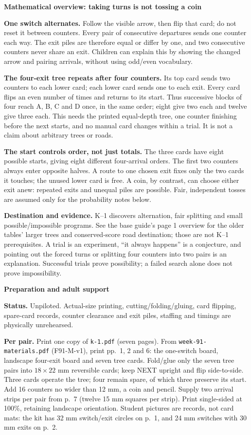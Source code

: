 \documentclass[11pt]{article}
\newcommand{\head}[1]{\par\textbf{\large #1}\par}
\newcommand{\code}[1]{\texttt{#1}}
\begin{document}
\head{Mathematical overview: taking turns is not tossing a coin}
\textbf{One switch alternates.} Follow the visible arrow, then flip that card; do not reset it between counters. Every pair of consecutive departures sends one counter each way. The exit piles are therefore equal or differ by one, and two consecutive counters never share an exit. Children can explain this by showing the changed arrow and pairing arrivals, without using odd/even vocabulary.

\textbf{The four-exit tree repeats after four counters.} Its top card sends two counters to each lower card; each lower card sends one to each exit. Every card flips an even number of times and returns to its start. Thus successive blocks of four reach A, B, C and D once, in the same order; eight give two each and twelve give three each. This needs the printed equal-depth tree, one counter finishing before the next starts, and no manual card changes within a trial. It is not a claim about arbitrary trees or roads.

\textbf{The start controls order, not just totals.} The three cards have eight possible starts, giving eight different four-arrival orders. The first two counters always enter opposite halves. A route to one chosen exit fixes only the two cards it touches; the unused lower card is free. A coin, by contrast, can choose either exit anew: repeated exits and unequal piles are possible. Fair, independent tosses are assumed only for the probability notes below.

\textbf{Destination and evidence.} K--1 discovers alternation, fair splitting and small possible/impossible programs. See the base guide's page 1 overview for the older tables' larger trees and conserved-score road destination; those are not K--1 prerequisites. A trial is an experiment, ``it always happens'' is a conjecture, and pointing out the forced turns or splitting four counters into two pairs is an explanation. Successful trials prove possibility; a failed search alone does not prove impossibility.

\head{Preparation and adult support}
\textbf{Status.} Unpiloted. Actual-size printing, cutting/folding/gluing, card flipping, spare-card records, counter clearance and exit piles, staffing and timings are physically unrehearsed.

\textbf{Per pair.} Print one copy of \code{k-1.pdf} (seven pages). From \code{week-91-materials.pdf} (F91-M-v1), print pp.\ 1, 2 and 6: the one-switch board, landscape four-exit board and seven tree cards. Fold/glue only the seven tree pairs into $18\times22$ mm reversible cards; keep NEXT upright and flip side-to-side. Three cards operate the tree; four remain spare, of which three preserve its start. Add 16 counters no wider than 12 mm, a coin and pencil. Supply two arrival strips per pair from p.\ 7 (twelve 15 mm squares per strip). Print single-sided at 100\%, retaining landscape orientation. Student pictures are records, not card mats: the kit has 32 mm switch/exit circles on p.\ 1, and 24 mm switches with 30 mm exits on p.\ 2.
\end{document}
